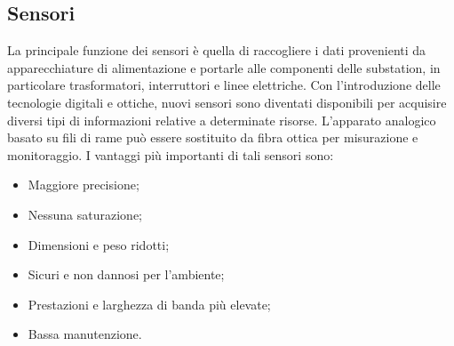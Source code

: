 \subsection{Sensori}
La principale funzione dei sensori è quella di raccogliere i dati provenienti da apparecchiature di alimentazione e portarle alle componenti delle substation, in particolare trasformatori, interruttori e linee elettriche. Con l'introduzione delle tecnologie digitali e ottiche, nuovi sensori sono diventati disponibili per acquisire diversi tipi di informazioni relative a determinate risorse. L'apparato analogico basato su fili di rame può essere sostituito da fibra ottica per misurazione e monitoraggio.
\newline
I vantaggi più importanti di tali sensori sono:
\begin{itemize}
	\item Maggiore precisione;
	\item Nessuna saturazione;
	\item Dimensioni e peso ridotti;
	\item Sicuri e non dannosi per l'ambiente;
	\item Prestazioni e larghezza di banda più elevate;
	\item Bassa manutenzione.
\end{itemize}


